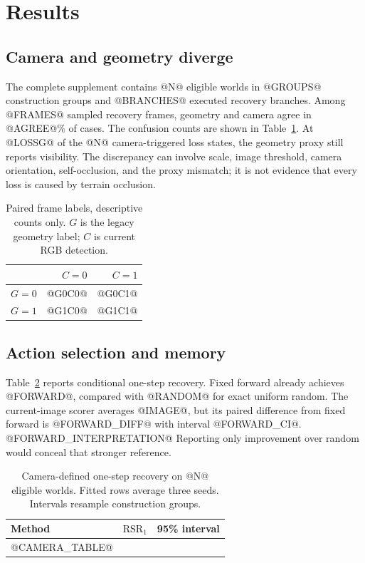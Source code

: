 \documentclass[10pt,twocolumn,a4paper]{article}
\begin{document}
\section{Results}
\subsection{Camera and geometry diverge}
The complete supplement contains @N@ eligible worlds in @GROUPS@ construction groups and @BRANCHES@ executed recovery branches. Among @FRAMES@ sampled recovery frames, geometry and camera agree in @AGREE@\% of cases. The confusion counts are shown in Table~\ref{tab:confusion}. At @LOSSG@ of the @N@ camera-triggered loss states, the geometry proxy still reports visibility. The discrepancy can involve scale, image threshold, camera orientation, self-occlusion, and the proxy mismatch; it is not evidence that every loss is caused by terrain occlusion.

\begin{table}[t]
\centering\small
\caption{Paired frame labels, descriptive counts only. $G$ is the legacy geometry label; $C$ is current RGB detection.}
\begin{tabular}{lrr}\toprule & $C=0$ & $C=1$\\\midrule
$G=0$ & @G0C0@ & @G0C1@\\
$G=1$ & @G1C0@ & @G1C1@\\\bottomrule
\end{tabular}\label{tab:confusion}
\end{table}

\subsection{Action selection and memory}
Table~\ref{tab:camera} reports conditional one-step recovery. Fixed forward already achieves @FORWARD@, compared with @RANDOM@ for exact uniform random. The current-image scorer averages @IMAGE@, but its paired difference from fixed forward is @FORWARD_DIFF@ with interval @FORWARD_CI@. @FORWARD_INTERPRETATION@ Reporting only improvement over random would conceal that stronger reference.

\begin{table}[t]
\centering\small
\caption{Camera-defined one-step recovery on @N@ eligible worlds. Fitted rows average three seeds. Intervals resample construction groups.}
\begin{tabular}{lrr}\toprule Method & $\mathrm{RSR}_1$ & 95\% interval\\\midrule
@CAMERA_TABLE@
\bottomrule\end{tabular}\label{tab:camera}
\end{table}
\end{document}
